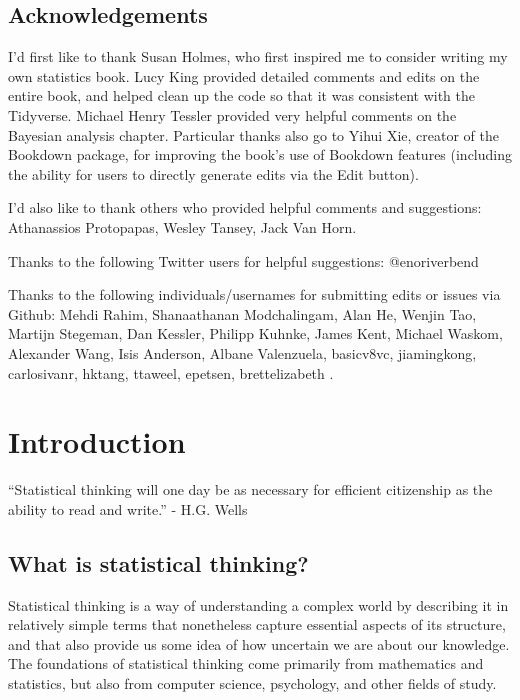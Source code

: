 \documentclass[]{book}
\theoremstyle{definition}
\theoremstyle{definition}
\theoremstyle{definition}
\theoremstyle{remark}
\begin{document}
\section{Acknowledgements}\label{acknowledgements}

I'd first like to thank Susan Holmes, who first inspired me to consider
writing my own statistics book. Lucy King provided detailed comments and
edits on the entire book, and helped clean up the code so that it was
consistent with the Tidyverse. Michael Henry Tessler provided very
helpful comments on the Bayesian analysis chapter. Particular thanks
also go to Yihui Xie, creator of the Bookdown package, for improving the
book's use of Bookdown features (including the ability for users to
directly generate edits via the Edit button).

I'd also like to thank others who provided helpful comments and
suggestions: Athanassios Protopapas, Wesley Tansey, Jack Van Horn.

Thanks to the following Twitter users for helpful suggestions:
@enoriverbend

Thanks to the following individuals/usernames for submitting edits or
issues via Github: Mehdi Rahim, Shanaathanan Modchalingam, Alan He,
Wenjin Tao, Martijn Stegeman, Dan Kessler, Philipp Kuhnke, James Kent,
Michael Waskom, Alexander Wang, Isis Anderson, Albane Valenzuela,
basicv8vc, jiamingkong, carlosivanr, hktang, ttaweel, epetsen,
brettelizabeth .

\chapter{Introduction}\label{introduction}

``Statistical thinking will one day be as necessary for efficient
citizenship as the ability to read and write.'' - H.G. Wells

\section{What is statistical
thinking?}\label{what-is-statistical-thinking}

Statistical thinking is a way of understanding a complex world by
describing it in relatively simple terms that nonetheless capture
essential aspects of its structure, and that also provide us some idea
of how uncertain we are about our knowledge. The foundations of
statistical thinking come primarily from mathematics and statistics, but
also from computer science, psychology, and other fields of study.
\end{document}
